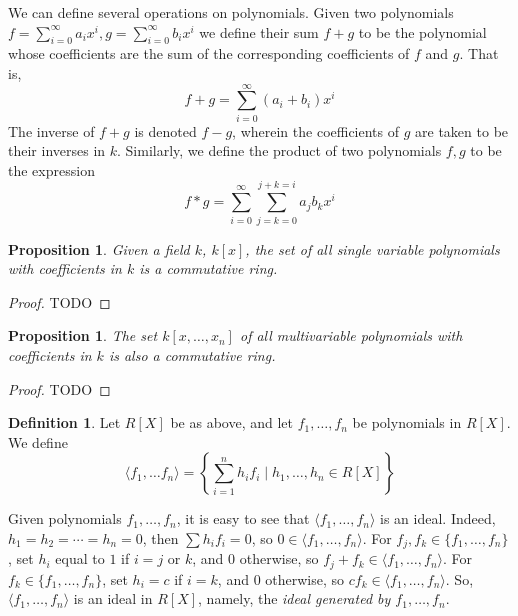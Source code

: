 \documentclass{amsart}
\newtheorem{proposition}[theorem]{Proposition}
\theoremstyle{definition}
\newtheorem{definition}[theorem]{Definition}
\theoremstyle{remark}
\numberwithin{equation}{section}
\begin{document}
{We can define several operations on polynomials. Given two polynomials $f = \sum_{i = 0}^\infty a_ix^i, g = \sum_{i = 0}^\infty b_ix^i$ we define their sum $f + g$ to be the polynomial whose coefficients are the sum of the corresponding coefficients of $f$ and $g$. That is,
\begin{equation*}
  f + g = \sum_{i = 0}^\infty (a_i + b_i)x^i
\end{equation*}
The inverse of $f + g$ is denoted $f - g$, wherein the coefficients of $g$ are taken to be their inverses in $k$. Similarly, we define the product of two polynomials $f, g$ to be the expression
\begin{equation*}
  f * g = \sum_{i = 0}^\infty \sum_{j = k = 0}^{j + k = i} a_jb_k x^i
\end{equation*}

\begin{proposition}
  Given a field $k$, $k[x]$, the set of all single variable polynomials with coefficients in $k$ is a commutative ring.
\end{proposition}

\begin{proof}
  TODO
\end{proof}

\begin{proposition}
  The set $k[x, \ldots, x_n]$ of all multivariable polynomials with coefficients in $k$ is also a commutative ring.
\end{proposition}

\begin{proof}
  TODO
\end{proof}

\begin{definition}
  Let $R[X]$ be as above, and let $f_1, \ldots, f_n$ be polynomials in $R[X]$. We define
  \begin{equation*}
    \langle f_1, \ldots f_n \rangle = \left\{ \sum_{i = 1}^n h_i f_i \mid h_1, \ldots, h_n \in R[X] \right\}
  \end{equation*}
\end{definition}

Given polynomials $f_1, \ldots, f_n$, it is easy to see that $\langle f_1, \ldots, f_n \rangle$ is an ideal. Indeed, $h_1 = h_2 = \cdots = h_n = 0$, then $\sum h_i f_i = 0$, so $0 \in \langle f_1, \ldots, f_n \rangle$. For $f_j, f_k \in \{ f_1, \ldots, f_n \}$, set $h_i$ equal to $1$ if $i = j$ or $k$, and $0$ otherwise, so $f_j + f_k \in \langle f_1, \ldots, f_n \rangle$. For $f_k \in \{ f_1, \ldots, f_n \}$, set $h_i = c$ if $i = k$, and $0$ otherwise, so $c f_k \in \langle f_1, \ldots, f_n \rangle$. So, $\langle f_1, \ldots, f_n \rangle$ is an ideal in $R[X]$, namely, the \emph{ideal generated by $f_1, \ldots, f_n$}.

}
\end{document}
